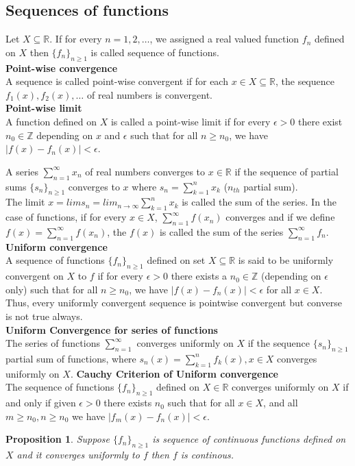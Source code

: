 \documentclass[12pt]{report}
\newtheorem{prop}{Proposition}
\begin{document}
\subsection*{Sequences of functions}
Let $X \subseteq \mathbb{R}$. If for every $n = 1,2, \dots$, we assigned a real valued function $f_n$ defined on $X$ then $\{f_n\}_{n \geq 1}$ is called sequence of  functions.\\
\textbf{Point-wise convergence}\\
A sequence is called point-wise convergent if for each $x \in X \subseteq \mathbb{R}$, the sequence $f_1(x), f_2(x), \dots$ of real numbers is convergent. \\
\textbf{Point-wise limit} \\
A function defined on $X$ is called a point-wise limit if for every $\epsilon > 0$ there exist $n_0 \in \mathbb{Z}$ depending on $x$ and $\epsilon$ such that for all $n \geq n_0$, we have $|f(x) - f_n(x)| < \epsilon$.

A series $\sum\limits_{n = 1}^{\infty} x_n$ of real numbers converges to $x \in \mathbb{R}$ if the sequence of partial sums $\{s_n\}_{n\geq 1}$ converges to $x$ where $s_n = \sum\limits_{k = 1}^n x_k$ ($n_{th}$ partial sum).\\
The limit $x = lims_n = lim_{n \to \infty}\sum\limits_{k = 1}^n x_k$ is called the sum of the series. In the case of functions, if for every $x \in X$, $\sum\limits_{n = 1}^{\infty} f(x_n)$ converges and if we define $f(x) = \sum\limits_{n = 1}^{\infty} f(x_n)$, the $f(x)$ is called the sum of the series $\sum\limits_{n = 1}^{\infty} f_n$.\\
\textbf{Uniform convergence}\\
A sequence of functions $\{f_n\}_{n \geq 1}$ defined on set $X \subseteq \mathbb{R}$ is said to be uniformly convergent on $X$ to $f$ if for every $\epsilon > 0$ there exists a $n_0 \in \mathbb{Z}$ (depending on $\epsilon$ only) such that for all $n \geq n_0$, we have $|f(x) - f_n(x)| < \epsilon$ for all $x \in X$.\\
Thus, every uniformly convergent sequence is pointwise convergent but converse is not true always.\\
\textbf{Uniform Convergence for series of functions}\\
The series of functions $\sum\limits_{n=1}^{\infty}$ converges uniformly on $X$ if the sequence $\{s_n\}_{n \geq 1}$ partial sum of functions, where $s_n(x) = \sum\limits_{k=1}^n f_k(x), x \in X$ converges uniformly on $X$.
\textbf{Cauchy Criterion of Uniform convergence}\\
The sequence of functions $\{f_n\}_{n\geq 1}$ defined on $X \in \mathbb{R}$ converges uniformly on $X$ if and only if given $\epsilon > 0$ there exists $n_0$ such that for all $x \in X$, and all $m \geq n_0,n\geq n_0$ we have $|f_m(x) -f_n(x)| < \epsilon$.
\begin{prop}
    Suppose $\{f_n\}_{n\geq 1}$ is sequence of continuous functions defined on $X$ and it converges uniformly to $f$ then $f$ is continous.
\end{prop}
\end{document}
